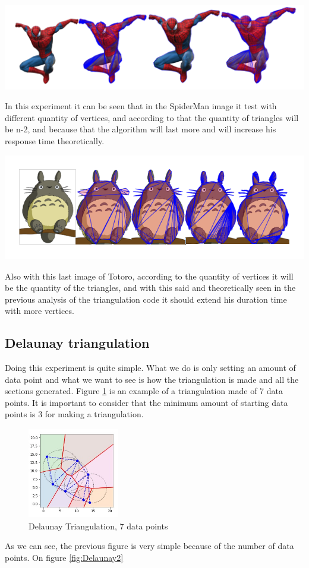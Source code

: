 \documentclass[conference]{IEEEtran}
\begin{document}
\includegraphics[scale=0.6]{spideyresults.png}

In this experiment it can be seen that in the SpiderMan image it test with different quantity of vertices, and according to that the quantity of triangles will be n-2, and because that the algorithm will last more and will increase his response time theoretically.

\includegraphics[scale=0.53]{totoroResults.png}

Also with this last image of Totoro, according to the quantity of vertices it will be the quantity of the triangles, and with this said and theoretically seen in the previous analysis of the triangulation code it should extend his duration time with more vertices.

\subsection{Delaunay triangulation}
Doing this experiment is quite simple. What we do is only setting an amount of data point and what we want to see is how the triangulation is made and all the sections generated. Figure \ref{fig:Delaunay1} is an example of a triangulation made of 7 data points. It is important to consider that the minimum amount of starting data points is 3 for making a triangulation.

\begin{figure}[H]
    \centering
    \includegraphics[width=150,height=150,keepaspectratio]{delaunay1.jpg}
    \caption{Delaunay Triangulation, 7 data points}
    \label{fig:Delaunay1}
\end{figure}
As we can see, the previous figure is very simple because of the number of data points. On figure \ref{fig:Delaunay2}
\end{document}
